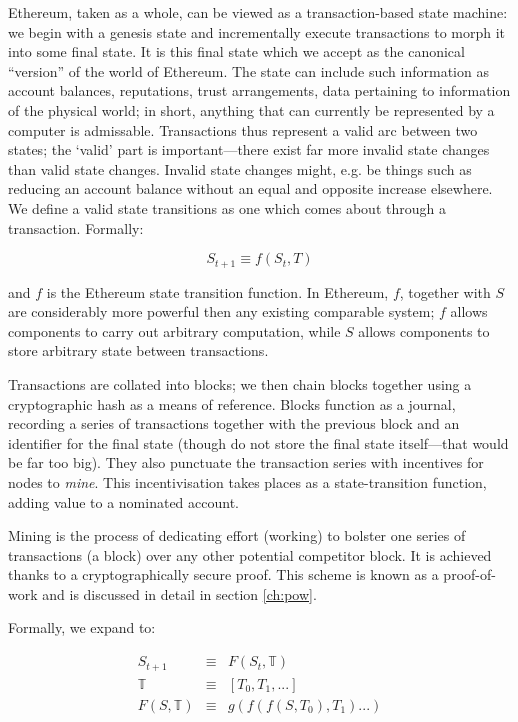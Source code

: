 \documentclass[9pt,oneside]{amsart}
\makeatletter
\newcommand*\eg{e.g.\@\xspace}
\makeatother
\begin{document}
\begin{multicols}{2}
Ethereum, taken as a whole, can be viewed as a transaction-based state machine: we begin with a genesis state and incrementally execute transactions to morph it into some final state. It is this final state which we accept as the canonical ``version'' of the world of Ethereum. The state can include such information as account balances, reputations, trust arrangements, data pertaining to information of the physical world; in short, anything that can currently be represented by a computer is admissable. Transactions thus represent a valid arc between two states; the `valid' part is important---there exist far more invalid state changes than valid state changes. Invalid state changes might, \eg be things such as reducing an account balance without an equal and opposite increase elsewhere. We define a valid state transitions as one which comes about through a transaction. Formally:

\begin{equation}
S_{t+1} \equiv f(S_t, T)
\end{equation}

and $f$ is the Ethereum state transition function. In Ethereum, $f$, together with $S$ are considerably more powerful then any existing comparable system; $f$ allows components to carry out arbitrary computation, while $S$ allows components to store arbitrary state between transactions.

Transactions are collated into blocks; we then chain blocks together using a cryptographic hash as a means of reference. Blocks function as a journal, recording a series of transactions together with the previous block and an identifier for the final state (though do not store the final state itself---that would be far too big). They also punctuate the transaction series with incentives for nodes to \textit{mine}. This incentivisation takes places as a state-transition function, adding value to a nominated account.

Mining is the process of dedicating effort (working) to bolster one series of transactions (a block) over any other potential competitor block. It is achieved thanks to a cryptographically secure proof. This scheme is known as a proof-of-work and is discussed in detail in section \ref{ch:pow}.

Formally, we expand to:

\begin{eqnarray}
S_{t+1} & \equiv & F(S_t, \mathbb{T}) \\
\mathbb{T} & \equiv & [ T_0, T_1, ... ] \\
F(S, \mathbb{T}) & \equiv & g(f(f(S, T_0), T_1) ...)
\end{eqnarray}


\end{multicols}
\end{document}
